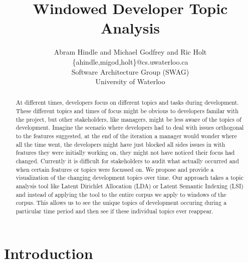 \documentclass[times, 10pt,twocolumn]{article}
\author{Abram Hindle and Michael Godfrey and Ric Holt \\
\{ahindle,migod,holt\}@cs.uwaterloo.ca\\
Software Architecture Group (SWAG)\\
University of Waterloo\\
}
\title{Windowed Developer Topic Analysis}
\newcommand{\lda}{Latent Dirichlet Allocation}
\begin{document}
\maketitle
\begin{abstract}

  At different times, developers focus on different topics and tasks
  during development.  These different topics and times of focus might
  be obvious to developers familar with the project, but other
  stakeholders, like managers, might be less aware of the topics of
  development. Imagine the scenario where developers had to deal with
  issues orthogonal to the features suggested, at the end of the
  iteration a manager would wonder where all the time went, the
  developers might have just blocked all sides issues in with features
  they were initially working on, they might not have noticed their
  focus had changed.  Currently it is difficult for stakeholders to
  audit what actually occurred and when certain features or topics
  were focussed on. We propose and provide a visualization of the
  changing development topics over time. Our approach takes a topic
  analysis tool like Latent Dirichlet Allocation (LDA) or Latent
  Semantic Indexing (LSI) and instead of applying the tool to the
  entire corpus we apply to windows of the corpus. This allows us to
  see the unique topics of development occuring during a particular
  time period and then see if these individual topics ever reappear.
  






\end{abstract}

\section{Introduction}



% 
\end{document}
